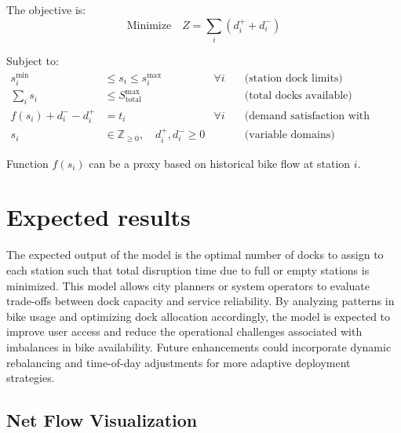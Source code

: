 \documentclass[11pt,a4paper]{article}
\begin{document}
\noindent The objective is:
\[
\text{Minimize} \quad Z = \sum_{i} (d_i^+ + d_i^-)
\]

\noindent Subject to:
\begin{align*}
    s_i^{\min} &\leq s_i \leq s_i^{\max} & \forall i \quad &\text{(station dock limits)} \\
    \sum_i s_i &\leq S_{\text{total}}^{\max} & \quad &\text{(total docks available)} \\
    f(s_i) + d_i^- - d_i^+ &= t_i & \forall i \quad &\text{(demand satisfaction with deviation)} \\
    s_i &\in \mathbb{Z}_{\geq 0}, \quad d_i^+, d_i^- \geq 0 & \quad &\text{(variable domains)}
\end{align*}

\noindent Function $f(s_i)$ can be a proxy based on historical bike flow at station $i$.

\section{Expected results}
The expected output of the model is the optimal number of docks to assign to each station such that total disruption time due to full or empty stations is minimized. This model allows city planners or system operators to evaluate trade-offs between dock capacity and service reliability. By analyzing patterns in bike usage and optimizing dock allocation accordingly, the model is expected to improve user access and reduce the operational challenges associated with imbalances in bike availability. Future enhancements could incorporate dynamic rebalancing and time-of-day adjustments for more adaptive deployment strategies.

\subsection*{Net Flow Visualization}
\begin{center}
\end{center}
\end{document}
